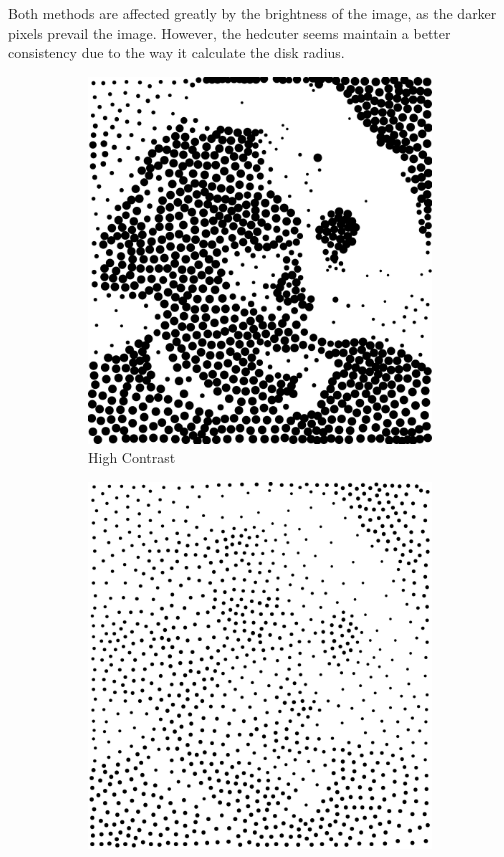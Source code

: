 \documentclass[11pt]{article}
\begin{document}
\begin{enumerate}
Both methods are affected greatly by the brightness of the image, as the darker pixels prevail the image. However, the hedcuter seems maintain a better consistency due to the way it calculate the disk radius.

\begin{figure}[H]
    \centering
        \begin{subfigure}{0.4\textwidth}
        \centering
        \includegraphics[width=\textwidth]{../results/hedcuter/3-1.pdf}
         \caption{High Contrast}
    \end{subfigure}
    \begin{subfigure}{0.4\textwidth}
        \centering
        \includegraphics[width=\textwidth]{../results/hedcuter/3-2.pdf}

\end{subfigure}
\end{figure}
\end{enumerate}
\end{document}
